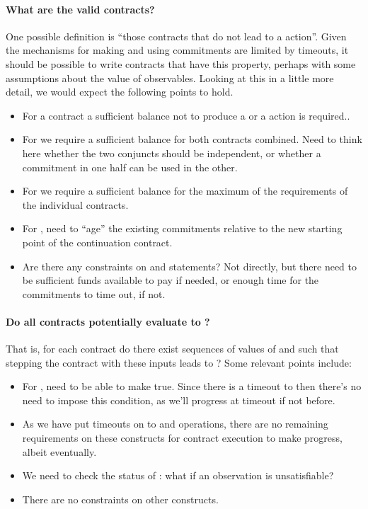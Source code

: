 \documentclass[
      acmsmall
    , screen
    , review=true
  ]{acmart}
\begin{document}
\paragraph{What are the valid contracts?}

One possible definition is ``those contracts that do not lead to a  action''.
Given the mechanisms for making and using commitments are limited by timeouts, it should be possible to write contracts that have this property, perhaps with some assumptions about the value of observables.
Looking at this in a little more detail, we would expect the following points to hold.
\begin{itemize}
\item For a  contract a sufficient balance not to produce a  or a  action is required.. 
\item For  we require a sufficient balance for both contracts combined. Need to think here whether the two conjuncts should be independent, or whether a commitment in one half can be used in the other.
\item For  we require a sufficient balance for the maximum of the requirements of the individual contracts. 
\item For , need to ``age'' the existing commitments relative to the new starting point of the continuation contract. 
\item Are there any constraints on   and  statements? Not directly, but there need to be sufficient funds available to pay if needed, or enough time for the commitments to time out, if not.
\end{itemize}

\paragraph{Do all contracts potentially evaluate to ?}

That is, for each contract do there exist sequences of values of  and  such that stepping the contract with these inputs leads to ? Some relevant points include:
\begin{itemize}
\item For , need to be able to make  true. Since there is a timeout to  then there's no need to impose this condition, as we'll progress at timeout if not before.
\item As we have put timeouts on to  and  operations, there are no remaining requirements on these constructs for contract execution to make progress, albeit eventually.
\item We need to check the status of : what if an observation is unsatisfiable?
\item There are no constraints on other constructs.
\end{itemize}
\end{document}
